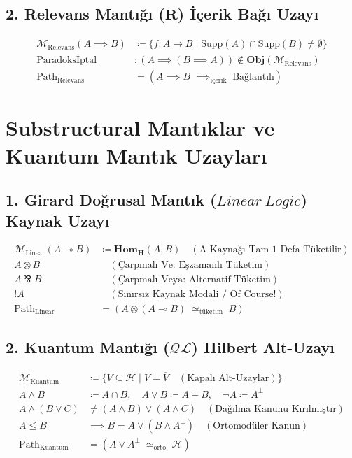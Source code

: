 \documentclass[11pt, a4paper]{article}
\begin{document}
\subsection{2. Relevans Mantığı ($\mathbf{R}$) İçerik Bağı Uzayı}
\begin{align}
\mathcal{M}_{\text{Relevans}}(A \implies B) &\coloneqq \{ f : A \to B \mid \text{Supp}(A) \cap \text{Supp}(B) \neq \emptyset \} \\
\text{Paradoksİptal} &: (A \implies (B \implies A)) \notin \mathbf{Obj}(\mathcal{M}_{\text{Relevans}}) \\
\text{Path}_{\text{Relevans}} &= (A \implies B \;\implies_{\text{içerik}}\; \text{Bağlantılı})
\end{align}

\section{Substructural Mantıklar ve Kuantum Mantık Uzayları}

\subsection{1. Girard Doğrusal Mantık ($Linear\ Logic$) Kaynak Uzayı}
\begin{align}
\mathcal{M}_{\text{Linear}}(A \multimap B) &\coloneqq \mathbf{Hom}_{\mathbf{H}}(A, B) \quad (\text{A Kaynağı Tam 1 Defa Tüketilir}) \\
A \otimes B &\quad (\text{Çarpmalı Ve: Eşzamanlı Tüketim}) \\
A \bindnasrepma B &\quad (\text{Çarpmalı Veya: Alternatif Tüketim}) \\
!A &\quad (\text{Sınırsız Kaynak Modali / Of Course!}) \\
\text{Path}_{\text{Linear}} &= (A \otimes (A \multimap B) \;\simeq_{\text{tüketim}}\; B)
\end{align}

\subsection{2. Kuantum Mantığı ($\mathcal{Q}\mathcal{L}$) Hilbert Alt-Uzayı}
\begin{align}
\mathcal{M}_{\text{Kuantum}} &\coloneqq \{ V \subseteq \mathcal{H} \mid V = \overline{V} \quad (\text{Kapalı Alt-Uzaylar}) \} \\
A \land B &\coloneqq A \cap B, \quad A \lor B \coloneqq \overline{A + B}, \quad \neg A \coloneqq A^\bot \\
A \land (B \lor C) &\neq (A \land B) \lor (A \land C) \quad (\text{Dağılma Kanunu Kırılmıştır}) \\
A \le B &\implies B = A \lor (B \land A^\bot) \quad (\text{Ortomodüler Kanun}) \\
\text{Path}_{\text{Kuantum}} &= (A \lor A^\bot \;\simeq_{\text{orto}}\; \mathcal{H})
\end{align}
\end{document}
